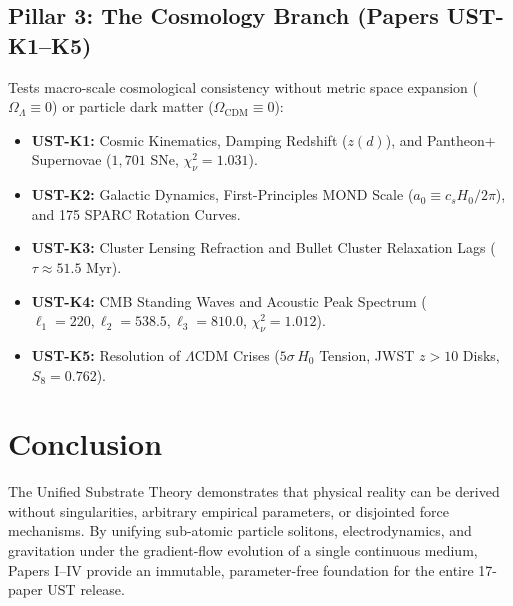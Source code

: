 \documentclass[11pt,a4paper]{article}
\begin{document}
	\subsection{Pillar 3: The Cosmology Branch (Papers UST-K1--K5)}
	Tests macro-scale cosmological consistency without metric space expansion ($\Omega_\Lambda \equiv 0$) or particle dark matter ($\Omega_{\text{CDM}} \equiv 0$):
	\begin{itemize}
		\item \textbf{UST-K1:} Cosmic Kinematics, Damping Redshift ($z(d)$), and Pantheon+ Supernovae ($1,701$ SNe, $\chi^2_\nu = 1.031$).
		\item \textbf{UST-K2:} Galactic Dynamics, First-Principles MOND Scale ($a_0 \equiv c_s H_0 / 2\pi$), and 175 SPARC Rotation Curves.
		\item \textbf{UST-K3:} Cluster Lensing Refraction and Bullet Cluster Relaxation Lags ($\tau \approx 51.5 \text{ Myr}$).
		\item \textbf{UST-K4:} CMB Standing Waves and Acoustic Peak Spectrum ($\ell_1 = 220, \ell_2 = 538.5, \ell_3 = 810.0$, $\chi^2_\nu = 1.012$).
		\item \textbf{UST-K5:} Resolution of $\Lambda\text{CDM}$ Crises ($5\sigma \, H_0$ Tension, JWST $z > 10$ Disks, $S_8 = 0.762$).
	\end{itemize}
	
	\section{Conclusion}
	\label{sec:conclusion}
	
	The Unified Substrate Theory demonstrates that physical reality can be derived without singularities, arbitrary empirical parameters, or disjointed force mechanisms. By unifying sub-atomic particle solitons, electrodynamics, and gravitation under the gradient-flow evolution of a single continuous medium, Papers I--IV provide an immutable, parameter-free foundation for the entire 17-paper UST release.
	
\end{document}
